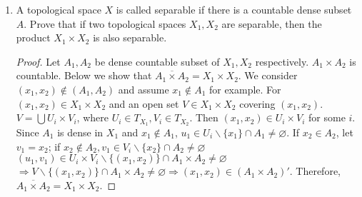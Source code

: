 \documentclass{article}
\def\emptyset{\varnothing}
\begin{document}
\begin{enumerate}
\begin{proof}
If $x\in A$, $f(x)=0$; if $f(x)=0$, there exists $\{y_n\}\subseteq A$ such that $d(x,y_n)\to 0$, and $x\in \bar{A}=A$
\end{proof}
\item A topological space $X$ is called separable if there is a countable dense subset $A$. Prove that if two topological spaces $X_1,X_2$ are separable, then the product $X_1\times X_2$ is also separable.
\begin{proof}
Let $A_1,A_2$ be dense countable subset of $X_1,X_2$ respectively. $A_1\times A_2$ is countable. Below we show that $\overline{A_1\times A_2}=X_1\times X_2$.
We consider $(x_1,x_2) \notin (A_1,A_2)$ and assume $x_1\notin A_1$ for example. 
For $(x_1,x_2)\in X_1\times X_2$ and an open set $V\in X_1\times X_2$ covering $(x_1,x_2)$. 
$V=\bigcup U_i\times V_i$, where $U_i\in T_{X_1},V_i \in T_{X_2}$. 
Then $(x_1,x_2)\in U_i\times V_i$ for some $i$. 
Since $A_1$ is dense in $X_1$ and $x_1\notin A_1$, 
$u_1 \in U_i\backslash\{x_1\}\cap A_1\neq \emptyset$. 
If $x_2 \in A_2$, let $v_1 = x_2$; if $x_2 \not\in A_2, v_1 \in V_i\backslash\{x_2\}\cap A_2 \neq \emptyset$
$(u_1, v_1) \in U_i\times V_i\backslash\{(x_1,x_2)\}\cap A_1\times A_2 \neq \emptyset$
$\Rightarrow V\backslash\{(x_1,x_2)\}\cap A_1\times A_2 \neq \emptyset\Rightarrow (x_1,x_2)\in (A_1\times A_2)'$. 
Therefore,  $\overline{A_1\times A_2}=X_1\times X_2$.
\end{proof}
\end{enumerate}
\end{document}
